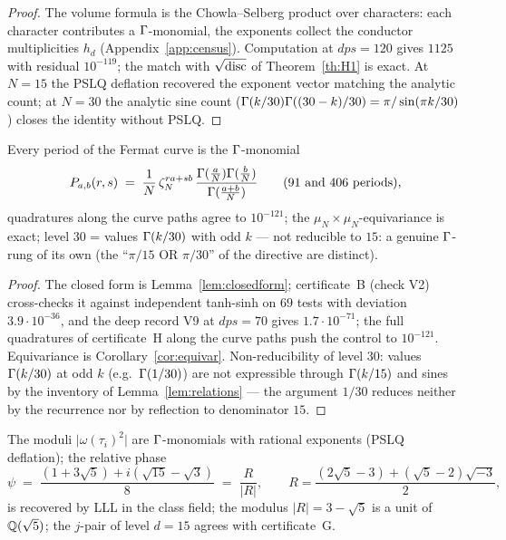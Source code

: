 \begin{proof}
The volume formula is the Chowla--Selberg product over characters:
each character contributes a $\Gamma$-monomial, the exponents collect
the conductor multiplicities $h_d$ (Appendix~\ref{app:census}).
Computation at $dps=120$ gives $1125$ with residual $10^{-119}$; the
match with $\sqrt{\operatorname{disc}}$ of Theorem~\ref{th:H1} is exact. At $N=15$
the PSLQ deflation recovered the exponent vector matching the
analytic count; at $N=30$ the analytic sine count
($\Gamma(k/30)\Gamma((30-k)/30)=\pi/\sin(\pi k/30)$) closes the identity
without PSLQ.
\end{proof}

\begin{theorem}\label{th:H3}
Every period of the Fermat curve is the $\Gamma$-monomial
\[
  P_{a,b}(r,s) \;=\; \frac{1}{N}\,
  \zeta_N^{ra+sb}\,\frac{\Gamma(\frac aN)\Gamma(\frac bN)}
  {\Gamma(\frac{a+b}N)}
  \qquad (91\ \text{and}\ 406\ \text{periods}),
\]
quadratures along the curve paths agree to $10^{-121}$; the
$\mu_N\times\mu_N$-equivariance is exact; level $30$ = values
$\Gamma(k/30)$ with odd $k$ --- not reducible to $15$: a genuine
$\Gamma$-rung of its own (the ``$\pi/15$ OR $\pi/30$'' of the directive
are distinct).
\end{theorem}

\begin{proof}
The closed form is Lemma~\ref{lem:closedform}; certificate~B (check
V2) cross-checks it against independent tanh-sinh on $69$ tests with
deviation $3.9\cdot10^{-36}$, and the deep record V9 at $dps=70$
gives $1.7\cdot10^{-71}$; the full quadratures of certificate~H along
the curve paths push the control to $10^{-121}$. Equivariance is
Corollary~\ref{cor:equivar}. Non-reducibility of level $30$: values
$\Gamma(k/30)$ at odd $k$ (e.g.\ $\Gamma(1/30)$) are not expressible
through $\Gamma(k/15)$ and sines by the inventory of
Lemma~\ref{lem:relations} --- the argument $1/30$ reduces neither by
the recurrence nor by reflection to denominator $15$.
\end{proof}

\begin{theorem}\label{th:H4}
The moduli $\bigl|\omega(\tau_i)^2\bigr|$ are $\Gamma$-monomials with
rational exponents (PSLQ deflation); the relative phase
\[
  \psi \;=\; \frac{(1+3\sqrt5)+i(\sqrt{15}-\sqrt3)}{8}
  \;=\; \frac{R}{|R|},
  \qquad R=\frac{(2\sqrt5-3)+(\sqrt5-2)\sqrt{-3}}{2},
\]
is recovered by LLL in the class field; the modulus $|R|=3-\sqrt5$
is a unit of $\mathbb{Q}(\sqrt5)$; the $j$-pair of level $d=15$ agrees with
certificate~G.
\end{theorem}

